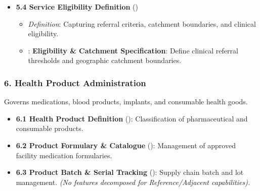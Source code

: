 \begin{itemize}
\begin{itemize}

\item 
\emph{Definition}: Modeling regular operating hours, exceptional closures, and emergency availability.



\item 
\texttt{}: \textbf{Operating Schedule Specification}: Define temporal availability, clinic operating hours, and on-call service windows.



\end{itemize}


\item 
\textbf{5.4 Service Eligibility Definition} (\texttt{})


\begin{itemize}

\item 
\emph{Definition}: Capturing referral criteria, catchment boundaries, and clinical eligibility.



\item 
\texttt{}: \textbf{Eligibility \& Catchment Specification}: Define clinical referral thresholds and geographic catchment boundaries.



\end{itemize}


\end{itemize}
\label{rad:enabling:208}
\subsubsection*{6. Health Product Administration}
\label{rad:enabling:209}

Governs medications, blood products, implants, and consumable health goods.

\label{rad:enabling:210}

\begin{itemize}

\item 
\textbf{6.1 Health Product Definition} (\texttt{}): Classification of pharmaceutical and consumable products.



\item 
\textbf{6.2 Product Formulary \& Catalogue} (\texttt{}): Management of approved facility medication formularies.



\item 
\textbf{6.3 Product Batch \& Serial Tracking} (\texttt{}): Supply chain batch and lot management. \emph{(No features decomposed for Reference/\allowbreak{}Adjacent capabilities).}



\end{itemize}
\label{rad:enabling:215}
